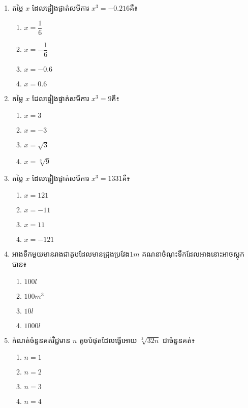 \begin{enumerate}
\item តម្លៃ $x$ ដែលផ្ទៀងផ្ទាត់សមីការ $x^3=-0.216$គឺ៖
\begin{multicols}{4}
\begin{enumerate}[label=\alph*.]
	\item $x=\dfrac{1}{6}$
	\item $x=-\dfrac{1}{6}$
	\item $x=-0.6$
	\item $x=0.6$
\end{enumerate}
\end{multicols}

\item តម្លៃ $x$ ដែលផ្ទៀងផ្ទាត់សមីការ $x^3=9$គឺ៖
\begin{multicols}{4}
\begin{enumerate}[label=\alph*.]
	\item $x=3$
	\item $x=-3$
	\item $x=\sqrt{3}$
	\item $x=\sqrt[3]{9}$
\end{enumerate}
\end{multicols}

\item តម្លៃ $x$ ដែលផ្ទៀងផ្ទាត់សមីការ $x^3=1331$គឺ៖
\begin{multicols}{4}
\begin{enumerate}[label=\alph*.]
	\item $x=121$
	\item $x=-11$
	\item $x=11$
	\item $x=-121$
\end{enumerate}
\end{multicols}

\item អាងទឹកមួយមានរាងជាគូបដែលមានជ្រុងប្រវែង$1m$ គណនាចំណុះទឹកដែលអាងនោះអាចស្តុកបាន៖
\begin{multicols}{4}
\begin{enumerate}[label=\alph*.]
	\item $100l$
	\item $100m^3$
	\item $10l$
	\item $1000l$
\end{enumerate}
\end{multicols}

\item កំណត់ចំនួនគត់វិជ្ជមាន $n$ តូចបំផុតដែលធ្វើអោយ $\sqrt[3]{32n}$ ជាចំនួនគត់៖
\begin{multicols}{4}
\begin{enumerate}[label=\alph*.]
	\item $n=1$
	\item $n=2$
	\item $n=3$
	\item $n=4$
\end{enumerate}
\end{multicols}


\end{enumerate}
